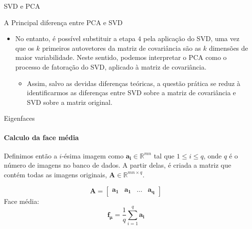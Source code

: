 \documentclass[xcolor=dvipsnames,t,aspectratio=169]{beamer} %
\begin{document}
\begin{frame}[c]{SVD e PCA}
    
        \begin{block}{A Principal diferença entre PCA e SVD}
        \begin{itemize}
            \item No entanto, é possível substituir a etapa $4$ pela aplicação do SVD, uma vez que os $k$ primeiros autovetores da matriz de covariância são as $k$ dimensões de maior variabilidade. Neste sentido, podemos interpretar o PCA como o processo de fatoração do SVD, aplicado à matriz de covariância.
            \begin{itemize}
                \item Assim, salvo as devidas diferenças teóricas, a questão prática se reduz à identificarmos as diferenças entre SVD sobre a matriz de covariância e SVD sobre a matriz original.
            \end{itemize}
        \end{itemize}
    
\end{block}

\end{frame}

\begin{frame}[c]{Eigenfaces}
\framesubtitle{Calculo da face média}

     Definimos então a $i$-ésima imagem como $\boldsymbol{a_i} \in \mathds{R}^{mn}$ tal que $1 \leq i \leq q$, onde $q$ é o número de imagens no banco de dados. A partir delas, é criada a matriz que contém todas as imagens originais, $\boldsymbol{A} \in \mathds{R}^{mn \times q}$.
        
            $$
            \boldsymbol{A} = \begin{bmatrix} \boldsymbol{a_1} & \boldsymbol{a_1} & \ldots & \boldsymbol{a_q} \end{bmatrix}
            $$
    Face média:
            $$
            \boldsymbol{f_\mu} = \frac{1}{q} \sum_{i=1}^{q} \boldsymbol{a_i}
            $$

\end{frame}
\end{document}
